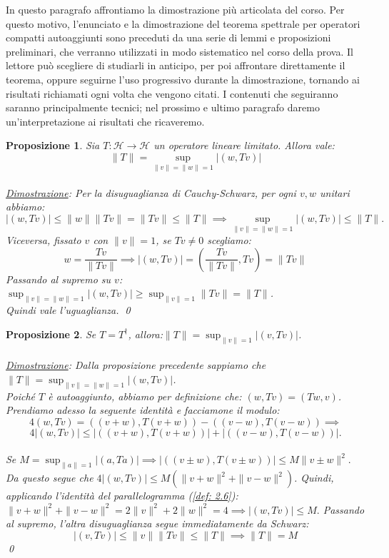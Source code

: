 \documentclass[a4paper,12pt]{report}
\newtheorem{proposizione}{Proposizione}[chapter]
\begin{document}
In questo paragrafo affrontiamo la dimostrazione più articolata del corso. Per questo motivo, l’enunciato e la dimostrazione del teorema spettrale per operatori compatti autoaggiunti sono preceduti da una serie di lemmi e proposizioni preliminari, che verranno utilizzati in modo sistematico nel corso della prova. Il lettore può scegliere di studiarli in anticipo, per poi affrontare direttamente il teorema, oppure seguirne l’uso progressivo durante la dimostrazione, tornando ai risultati richiamati ogni volta che vengono citati. I contenuti che seguiranno saranno principalmente tecnici; nel prossimo e ultimo paragrafo daremo un'interpretazione ai risultati che ricaveremo.

\begin{proposizione}\label{prop: 5.3}
Sia $T:\mathscr{H}\to\mathscr{H}$ un operatore lineare limitato. Allora vale:
\[\|T\|=\sup_{\|v\|=\|w\|=1}|(w,Tv)|\]
\\\underline{Dimostrazione}: Per la disuguaglianza di Cauchy-Schwarz, per ogni $v,w$ unitari abbiamo:
\[
|(w,Tv)|
\le
\|w\|\|Tv\|
=
\|Tv\|
\le
\|T\|\implies 
\sup_{\|v\|=\|w\|=1}|(w,Tv)|
\le
\|T\|.
\]
Viceversa, fissato $v$ con $\|v\|=1$, se $Tv\neq0$ scegliamo:
\[
w=\frac{Tv}{\|Tv\|}\implies 
|(w,Tv)|
=
\left(
\frac{Tv}{\|Tv\|},
Tv
\right)
=
\|Tv\|
\]
Passando al supremo su $v$: $\sup_{\|v\|=\|w\|=1}|(w,Tv)|
\ge
\sup_{\|v\|=1}\|Tv\|
=
\|T\|$. 
\\Quindi vale l’uguaglianza. \qed
\end{proposizione}
\vspace{1cm}
\begin{proposizione}\label{prop: 5.4}
Se $T=T^\dagger$, allora:$\|T\|=\sup_{\|v\|=1}|(v,Tv)|$.
\\
\\\underline{Dimostrazione}: Dalla proposizione precedente sappiamo che $\|T\|=\sup_{\|v\|=\|w\|=1}|(w,Tv)|$.
\\Poiché $T$ è autoaggiunto, abbiamo per definizione che: $(w,Tv)=(Tw,v)$. Prendiamo adesso la seguente identità e facciamone il modulo:
\[4(w,Tv)
=
((v+w),T(v+w))
-
((v-w),T(v-w))\implies 
\]
\[
4|(w,Tv)|
\le
|((v+w),T(v+w))|
+
|((v-w),T(v-w))|.
\]
\\Se
$
M=\sup_{\|a\|=1}|(a,Ta)|
\implies 
|((v\pm w),T(v\pm w))|
\le
M\|v\pm w\|^2.
$
\\Da questo segue che  $4|(w,Tv)|
\le
M(\|v+w\|^2+\|v-w\|^2)$. Quindi, applicando l'identità del parallelogramma (\ref{def: 2.6}): $\|v+w\|^2+\|v-w\|^2
=
2\|v\|^2+2\|w\|^2
=
4\implies 
|(w,Tv)|\le M.$
Passando al supremo, l’altra disuguaglianza segue immediatamente da Schwarz:
\[
|(v,Tv)|
\le
\|v\|\|Tv\|
\le
\|T\|\implies 
\|T\|=M
\]\qed
\end{proposizione}
\end{document}
